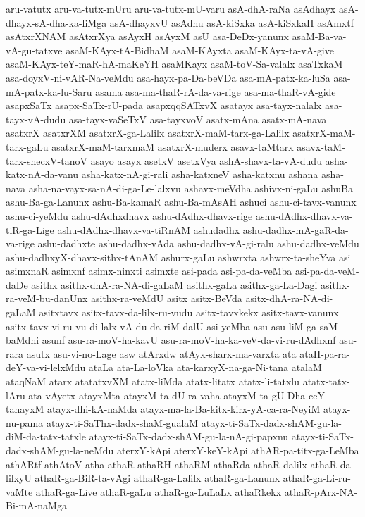 {aru-vatutx
aru-va-tutx-mUru
aru-va-tutx-mU-varu
asA-dhA-raNa
asAdhayx
asA-dhayx-sA-dha-ka-liMga
asA-dhayxvU
asAdhu
asA-kiSxka
asA-kiSxkaH
asAmxtf
asAtxrXNAM
asAtxrXya
asAyxH
asAyxM
asU
asa-DeDx-yanunx
asaM-Ba-va-vA-gu-tatxve
asaM-KAyx-tA-BidhaM
asaM-KAyxta
asaM-KAyx-ta-vA-give
asaM-KAyx-teY-maR-hA-maKeYH
asaMKayx
asaM-toV-Sa-valalx
asaTxkaM
asa-doyxV-ni-vAR-Na-veMdu
asa-hayx-pa-Da-beVDa
asa-mA-patx-ka-luSa
asa-mA-patx-ka-lu-Saru
asama
asa-ma-thaR-rA-da-va-rige
asa-ma-thaR-vA-gide
asapxSaTx
asapx-SaTx-rU-pada
asapxqqSATxvX
asatayx
asa-tayx-nalalx
asa-tayx-vA-dudu
asa-tayx-vaSeTxV
asa-tayxvoV
asatx-mAna
asatx-mA-nava
asatxrX
asatxrXM
asatxrX-ga-Lalilx
asatxrX-maM-tarx-ga-Lalilx
asatxrX-maM-tarx-gaLu
asatxrX-maM-tarxmaM
asatxrX-muderx
asavx-taMtarx
asavx-taM-tarx-shecxV-tanoV
asayo
asayx
asetxV
asetxVya
ashA-shavx-ta-vA-dudu
asha-katx-nA-da-vanu
asha-katx-nA-gi-rali
asha-katxneV
asha-katxnu
ashana
asha-nava
asha-na-vayx-sa-nA-di-ga-Le-lalxvu
ashavx-meVdha
ashivx-ni-gaLu
ashuBa
ashu-Ba-ga-Lanunx
ashu-Ba-kamaR
ashu-Ba-mAsAH
ashuci
ashu-ci-tavx-vanunx
ashu-ci-yeMdu
ashu-dAdhxdhavx
ashu-dAdhx-dhavx-rige
ashu-dAdhx-dhavx-va-tiR-ga-Lige
ashu-dAdhx-dhavx-va-tiRnAM
ashudadhx
ashu-dadhx-mA-gaR-da-va-rige
ashu-dadhxte
ashu-dadhx-vAda
ashu-dadhx-vA-gi-ralu
ashu-dadhx-veMdu
ashu-dadhxyX-dhavx-sithx-tAnAM
ashurx-gaLu
ashwrxta
ashwrx-ta-sheYva
asi
asimxnaR
asimxnf
asimx-ninxti
asimxte
asi-pada
asi-pa-da-veMba
asi-pa-da-veM-daDe
asithx
asithx-dhA-ra-NA-di-gaLaM
asithx-gaLa
asithx-ga-La-Dagi
asithx-ra-veM-bu-danUnx
asithx-ra-veMdU
asitx
asitx-BeVda
asitx-dhA-ra-NA-di-gaLaM
asitxtavx
asitx-tavx-da-lilx-ru-vudu
asitx-tavxkekx
asitx-tavx-vanunx
asitx-tavx-vi-ru-vu-di-lalx-vA-du-da-riM-dalU
asi-yeMba
asu
asu-liM-ga-saM-baMdhi
asunf
asu-ra-moV-ha-kavU
asu-ra-moV-ha-ka-veV-da-vi-ru-dAdhxnf
asu-rara
asutx
asu-vi-no-Lage
asw
atArxdw
atAyx-sharx-ma-varxta
ata
ataH-pa-ra-deY-va-vi-lelxMdu
ataLa
ata-La-loVka
ata-karxyX-na-ga-Ni-tana
atalaM
ataqNaM
atarx
atatatxvXM
atatx-liMda
atatx-litatx
atatx-li-tatxlu
atatx-tatx-lAru
ata-vAyetx
atayxMta
atayxM-ta-dU-ra-vaha
atayxM-ta-gU-Dha-ceY-tanayxM
atayx-dhi-kA-naMda
atayx-ma-la-Ba-kitx-kirx-yA-ca-ra-NeyiM
atayx-nu-pama
atayx-ti-SaThx-dadx-shaM-gualaM
atayx-ti-SaTx-dadx-shAM-gu-la-diM-da-tatx-tatxle
atayx-ti-SaTx-dadx-shAM-gu-la-nA-gi-papxnu
atayx-ti-SaTx-dadx-shAM-gu-la-neMdu
aterxY-kApi
aterxY-keY-kApi
athAR-pa-titx-ga-LeMba
athARtf
athAtoV
atha
athaR
athaRH
athaRM
athaRda
athaR-dalilx
athaR-da-lilxyU
athaR-ga-BiR-ta-vAgi
athaR-ga-Lalilx
athaR-ga-Lanunx
athaR-ga-Li-ru-vaMte
athaR-ga-Live
athaR-gaLu
athaR-ga-LuLaLx
athaRkekx
athaR-pArx-NA-Bi-mA-naMga
}

